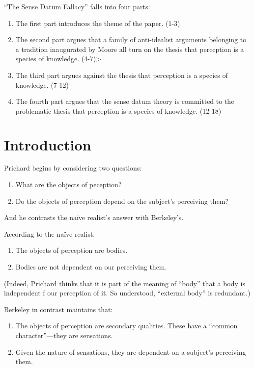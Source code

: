 \documentclass[11pt]{article}
\begin{document}
``The Sense Datum Fallacy'' falls into four parts:
\begin{enumerate}
    \item The first part introduces the theme of the paper. (1-3)
    \item The second part argues that a family of anti-idealist arguments belonging to a tradition inaugurated by Moore all turn on the thesis that perception is a species of knowledge. (4-7)>
    \item The third part argues against the thesis that perception is a species of knowledge. (7-12)
    \item The fourth part argues that the sense datum theory is committed to the problematic thesis that perception is a species of knowledge. (12-18)
\end{enumerate}

\section{Introduction} %
\label{sec:introduction}
Prichard begins by considering two questions:
\begin{enumerate}
    \item What are the objects of peception?
    \item Do the objects of perception depend on the subject's perceiving them?
\end{enumerate}
And he contrasts the naïve realist's answer with Berkeley's.

According to the naïve realist:
\begin{enumerate}
    \item The objects of perception are bodies.
    \item Bodies are not dependent on our perceiving them.
\end{enumerate}
(Indeed, Prichard thinks that it is part of the meaning of ``body'' that a body is independent f our perception of it. So understood, ``external body'' is redundant.)

Berkeley in contrast maintains that:
\begin{enumerate}
    \item The objects of perception are secondary qualities. These have a ``common character''---they are sensations.
    \item Given the nature of sensations, they are dependent on a subject's perceiving them.
\end{enumerate}
\end{document}
